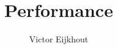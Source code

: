 \documentclass[11pt,headernav]{beamer}
\begin{document}
\title{Performance}
\author[Eijkhout]{Victor Eijkhout}
\date{\hpcsemester}

\begin{frame}
  \titlepage
\end{frame}


\end{document}
